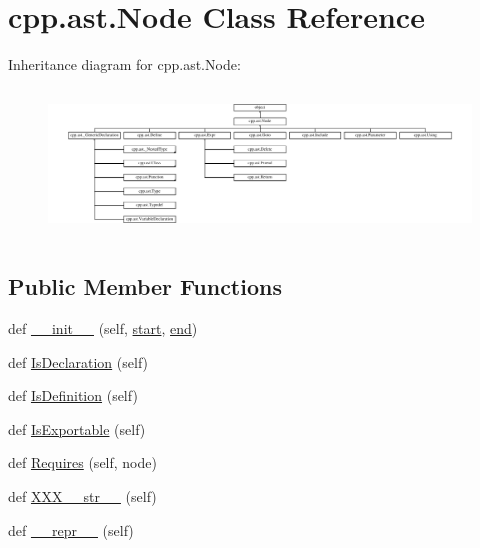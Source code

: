 \hypertarget{classcpp_1_1ast_1_1Node}{}\section{cpp.\+ast.\+Node Class Reference}
\label{classcpp_1_1ast_1_1Node}
Inheritance diagram for cpp.\+ast.\+Node\+:\begin{figure}[H]
\begin{center}
\leavevmode
\includegraphics[height=3.956044cm]{classcpp_1_1ast_1_1Node}
\end{center}
\end{figure}
\subsection*{Public Member Functions}
\begin{DoxyCompactItemize}
\item 
def \mbox{\hyperlink{classcpp_1_1ast_1_1Node_a2cbd6969346645259afc3be51faae904}{\+\_\+\+\_\+init\+\_\+\+\_\+}} (self, \mbox{\hyperlink{classcpp_1_1ast_1_1Node_a7b2aa97e6a049bb1a93aea48c48f1f44}{start}}, \mbox{\hyperlink{classcpp_1_1ast_1_1Node_a3c5e5246ccf619df28eca02e29d69647}{end}})
\item 
def \mbox{\hyperlink{classcpp_1_1ast_1_1Node_ab3eca703a79fb65bc25dfbcb7547c79e}{Is\+Declaration}} (self)
\item 
def \mbox{\hyperlink{classcpp_1_1ast_1_1Node_a684ee9a357168e7e07a24fc6812f66e6}{Is\+Definition}} (self)
\item 
def \mbox{\hyperlink{classcpp_1_1ast_1_1Node_a313273874ccf578485006d4000128234}{Is\+Exportable}} (self)
\item 
def \mbox{\hyperlink{classcpp_1_1ast_1_1Node_a31ae211f954a8c578ef16226df5ac8c8}{Requires}} (self, node)
\item 
def \mbox{\hyperlink{classcpp_1_1ast_1_1Node_ab5dfeabcbcd7c1f5feb8522edffb8b4a}{X\+X\+X\+\_\+\+\_\+str\+\_\+\+\_\+}} (self)
\item 
def \mbox{\hyperlink{classcpp_1_1ast_1_1Node_ab89915656a60c7b7c752e5baa607c532}{\+\_\+\+\_\+repr\+\_\+\+\_\+}} (self)
\end{DoxyCompactItemize}
